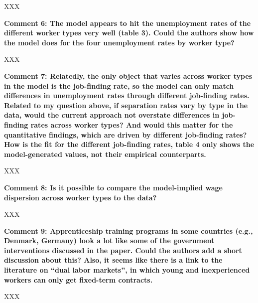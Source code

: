 \documentclass[12pt]{article}
\begin{document}
\begin{onehalfspacing}
\medskip
\noindent
XXX

\bigskip
\bigskip

\textbf{Comment 6: The model appears to hit the unemployment rates of the different worker types very well (table 3). Could the authors show how the model does for the four unemployment rates by worker type?}

\medskip
\noindent
XXX

\bigskip
\bigskip

\textbf{Comment 7: Relatedly, the only object that varies across worker types in the model is the job-finding rate, so the model can only match differences in unemployment rates through different job-finding rates. Related to my question above, if separation rates vary by type in the data, would the current approach not overstate differences in job-finding rates across worker types? And would this matter for the quantitative findings, which are driven by different job-finding rates? How is the fit for the different job-finding rates, table 4 only shows the model-generated values, not their empirical counterparts.}

\medskip
\noindent
XXX

\bigskip
\bigskip

\textbf{Comment 8: Is it possible to compare the model-implied wage dispersion across worker types to the data?}

\medskip
\noindent
XXX

\bigskip
\bigskip

\textbf{Comment 9: Apprenticeship training programs in some countries (e.g., Denmark, Germany) look a lot like some of the government interventions discussed in the paper. Could the authors add a short discussion about this? Also, it seems like there is a link to the literature on ``dual labor markets'', in which young and inexperienced workers can only get fixed-term contracts.}

\medskip
\noindent
XXX

\bigskip
\bigskip

\end{onehalfspacing}
\end{document}
